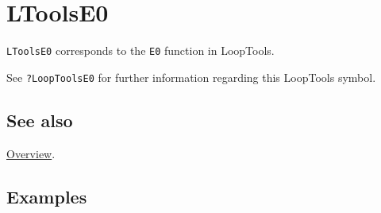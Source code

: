\documentclass[../FeynHelpersManual.tex]{subfiles}
\begin{document}
\hypertarget{ltoolse0}{
\section{LToolsE0}\label{ltoolse0}}

\texttt{LToolsE0} corresponds to the \texttt{E0} function in LoopTools.

See \texttt{?LoopTools\textasciigrave E0} for further information
regarding this LoopTools symbol.

\subsection{See also}

\hyperlink{toc}{Overview}.

\subsection{Examples}
\end{document}
